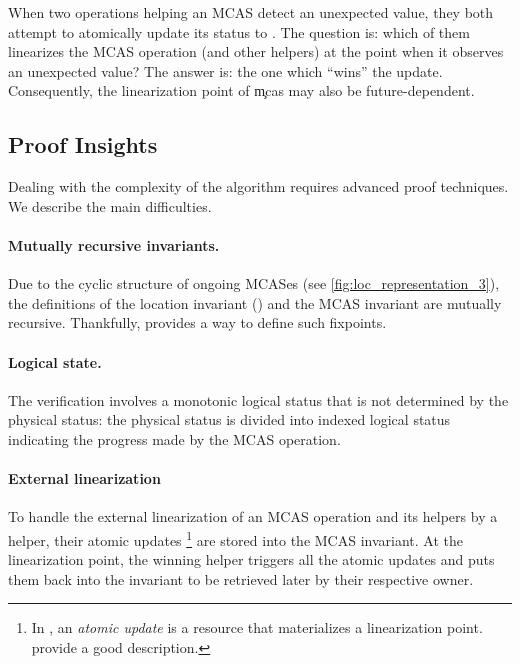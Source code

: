 When two operations helping an MCAS detect an unexpected value, they both attempt to atomically update its status to .
The question is: which of them linearizes the MCAS operation (and other helpers) at the point when it observes an unexpected value?
The answer is: the one which ``wins'' the update.
Consequently, the linearization point of \c{mcas} may also be future-dependent.

\subsection{Proof Insights}

Dealing with the complexity of the algorithm requires advanced proof techniques.
We describe the main difficulties.

\paragraph{Mutually recursive invariants.}

Due to the cyclic structure of ongoing MCASes (see \cref{fig:loc_representation_3}), the definitions of the location invariant (\locInv) and the MCAS invariant are mutually recursive.
Thankfully, \Iris provides a way to define such fixpoints.

\paragraph{Logical state.}

The verification involves a monotonic logical status that is not determined by the physical status: the physical  status is divided into indexed logical  status indicating the progress made by the MCAS operation.

\paragraph{External linearization}

To handle the external linearization of an MCAS operation and its helpers by a helper, their atomic updates%
\footnote{
In \Iris, an \emph{atomic update} is a resource that materializes a linearization point.
 provide a good description.
}
are stored into the MCAS invariant.
At the linearization point, the winning helper triggers all the atomic updates and puts them back into the invariant to be retrieved later by their respective owner.

